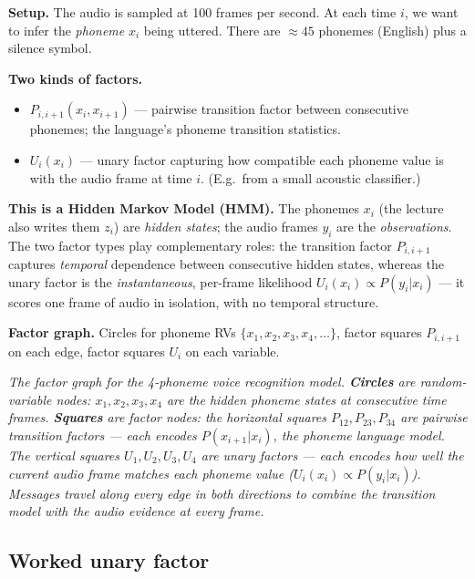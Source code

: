 \documentclass[11pt, a4paper]{article}
\begin{document}
\textbf{Setup.} The audio is sampled at 100 frames per second. At each time $i$, we want to infer the \emph{phoneme} $x_i$ being uttered. There are $\approx 45$ phonemes (English) plus a silence symbol.

\textbf{Two kinds of factors.}
\begin{itemize}
  \item $P_{i,i+1}(x_i, x_{i+1})$ — pairwise transition factor between consecutive phonemes; the language's phoneme transition statistics.
  \item $U_i(x_i)$ — unary factor capturing how compatible each phoneme value is with the audio frame at time $i$. (E.g.\ from a small acoustic classifier.)
\end{itemize}

\textbf{This is a Hidden Markov Model (HMM).} The phonemes $x_i$ (the lecture also writes them $z_i$) are \emph{hidden states}; the audio frames $y_i$ are the \emph{observations}. The two factor types play complementary roles: the transition factor $P_{i,i+1}$ captures \emph{temporal} dependence between consecutive hidden states, whereas the unary factor is the \emph{instantaneous}, per-frame likelihood $U_i(x_i)\propto P(y_i|x_i)$ — it scores one frame of audio in isolation, with no temporal structure.

\textbf{Factor graph.} Circles for phoneme RVs $\{x_1, x_2, x_3, x_4, \ldots\}$, factor squares $P_{i,i+1}$ on each edge, factor squares $U_i$ on each variable.

\begin{center}

\footnotesize\textit{The factor graph for the 4-phoneme voice recognition model. \textbf{Circles} are random-variable nodes: $x_1, x_2, x_3, x_4$ are the hidden phoneme states at consecutive time frames. \textbf{Squares} are factor nodes: the horizontal squares $P_{12}, P_{23}, P_{34}$ are pairwise transition factors --- each encodes $P(x_{i+1}|x_i)$, the phoneme language model. The vertical squares $U_1, U_2, U_3, U_4$ are unary factors --- each encodes how well the current audio frame matches each phoneme value ($U_i(x_i) \propto P(y_i|x_i)$). Messages travel along every edge in both directions to combine the transition model with the audio evidence at every frame.}
\end{center}

\subsection{Worked unary factor}
\end{document}
